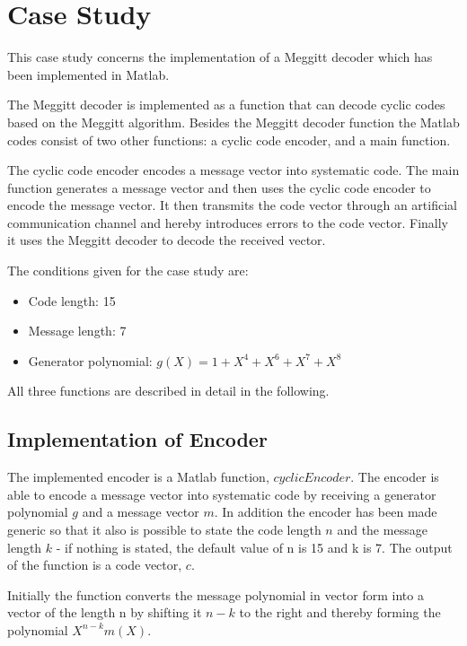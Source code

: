 \documentclass[Main]{subfiles}
\begin{document}
\section{Case Study}

%
%
%

This case study concerns the implementation of a Meggitt decoder which has been implemented in Matlab. 

The Meggitt decoder is implemented as a function that can decode cyclic codes based on the Meggitt algorithm. Besides the Meggitt decoder function the Matlab codes consist of two other functions: a cyclic code encoder, and a main function.

The cyclic code encoder encodes a message vector into systematic code. The main function generates a message vector and then uses the cyclic code encoder to encode the message vector. It then transmits the code vector through an artificial communication channel and hereby introduces errors to the code vector. Finally it uses the Meggitt decoder to decode the received vector. 

The conditions given for the case study are: 
\begin{itemize} \itemsep0pt \parskip0pt 
\item Code length: 15
\item Message length: 7
\item Generator polynomial: $g(X)=1+X^4+X^6+X^7+X^8$
\end{itemize} 

All three functions are described in detail in the following. 


\subsection{Implementation of Encoder}
\label{sec:ImplementEncoder}
The implemented encoder is a Matlab function, $cyclicEncoder$. The encoder is able to encode a message vector into systematic code by receiving a generator polynomial $g$ and a message vector $m$. In addition the encoder has been made generic so that it also is possible to state the code length $n$ and the message length $k$ - if nothing is stated, the default value of n is 15 and k is 7. The output of the function is a code vector, $c$. 

Initially the function converts the message polynomial in vector form into a vector of the length n by shifting it $n-k$ to the right and thereby forming the polynomial $X^{n-k}m(X)$. 
\end{document}
